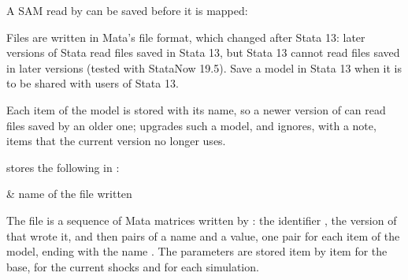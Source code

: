 
A SAM read by  can be saved before it is mapped:


Files are written in Mata's file format, which changed after Stata 13: later
versions of Stata read files saved in Stata 13, but Stata 13 cannot read files
saved in later versions (tested with StataNow 19.5). Save a model in Stata 13
when it is to be shared with users of Stata 13.

Each item of the model is stored with its name, so a newer version of \pkg can
read files saved by an older one;  upgrades such a model, and
ignores, with a note, items that the current version no longer uses.


 stores the following in :
\begin{storedres}
 & name of the file written\\
\end{storedres}


The file is a sequence of Mata matrices written by : the
identifier , the version of \pkg that wrote it, and then
pairs of a name and a value, one pair for each item of the model, ending with
the name . The parameters are stored item by item for the base,
for the current shocks and for each simulation.


\begin{alsosee}
\end{alsosee}
